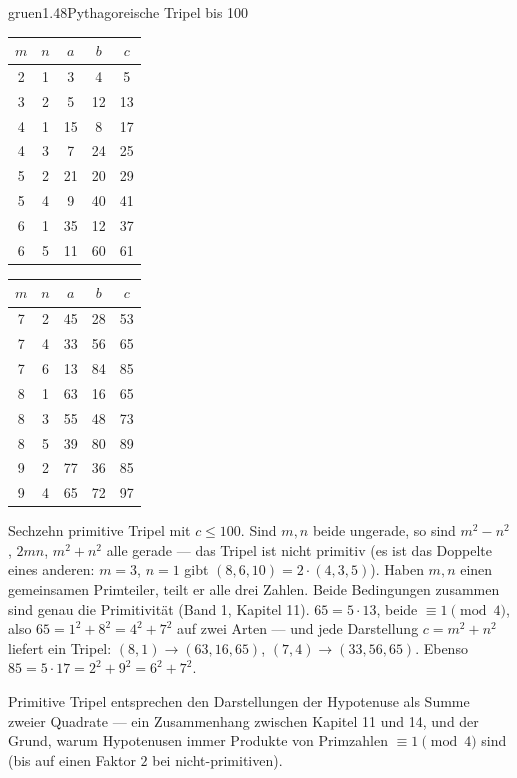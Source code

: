 \begin{loesungkarte}{gruen}{1.48}{Pythagoreische Tripel bis 100}
\begin{center}
{\small\renewcommand{\arraystretch}{1.25}
\begin{tabular}{@{}cc|ccc@{}}
$m$ & $n$ & $a$ & $b$ & $c$\\\hline
2 & 1 & 3 & 4 & 5\\ 3 & 2 & 5 & 12 & 13\\ 4 & 1 & 15 & 8 & 17\\ 4 & 3 & 7 & 24 & 25\\ 5 & 2 & 21 & 20 & 29\\ 5 & 4 & 9 & 40 & 41\\ 6 & 1 & 35 & 12 & 37\\ 6 & 5 & 11 & 60 & 61\\
\end{tabular}\qquad
\begin{tabular}{@{}cc|ccc@{}}
$m$ & $n$ & $a$ & $b$ & $c$\\\hline
7 & 2 & 45 & 28 & 53\\ 7 & 4 & 33 & 56 & 65\\ 7 & 6 & 13 & 84 & 85\\ 8 & 1 & 63 & 16 & 65\\ 8 & 3 & 55 & 48 & 73\\ 8 & 5 & 39 & 80 & 89\\ 9 & 2 & 77 & 36 & 85\\ 9 & 4 & 65 & 72 & 97\\
\end{tabular}}
\end{center}
Sechzehn primitive Tripel mit $c\le100$.
Sind $m, n$ beide ungerade, so sind $m^{2} - n^{2}$, $2mn$, $m^{2} + n^{2}$ alle gerade --- das Tripel ist nicht primitiv (es ist das Doppelte eines anderen: $m = 3$, $n = 1$ gibt $(8, 6, 10) = 2\cdot(4, 3, 5)$). Haben $m, n$ einen gemeinsamen Primteiler, teilt er alle drei Zahlen. Beide Bedingungen zusammen sind genau die Primitivität (Band 1, Kapitel 11).
$65 = 5\cdot13$, beide $\equiv1\pmod4$, also $65 = 1^{2} + 8^{2} = 4^{2} + 7^{2}$ auf zwei Arten --- und jede Darstellung $c = m^{2} + n^{2}$ liefert ein Tripel: $(8, 1)\to(63, 16, 65)$, $(7, 4)\to(33, 56, 65)$. Ebenso $85 = 5\cdot17 = 2^{2} + 9^{2} = 6^{2} + 7^{2}$.
\begin{mitnehmen}\kastentext
Primitive Tripel entsprechen den Darstellungen der Hypotenuse als Summe zweier Quadrate --- ein Zusammenhang zwischen Kapitel 11 und 14, und der Grund, warum Hypotenusen immer Produkte von Primzahlen $\equiv1\pmod4$ sind (bis auf einen Faktor $2$ bei nicht-primitiven).
\end{mitnehmen}
\end{loesungkarte}


